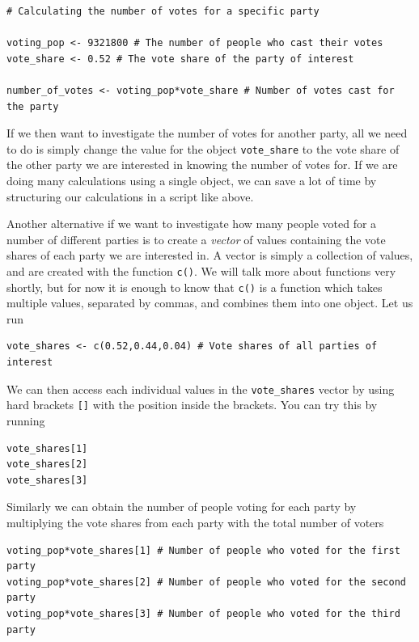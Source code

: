 \documentclass[
]{book}
\begin{document}
\begin{verbatim}
# Calculating the number of votes for a specific party

voting_pop <- 9321800 # The number of people who cast their votes
vote_share <- 0.52 # The vote share of the party of interest

number_of_votes <- voting_pop*vote_share # Number of votes cast for the party
\end{verbatim}

If we then want to investigate the number of votes for another party, all we need to do is simply change the value for the object \texttt{vote\_share} to the vote share of the other party we are interested in knowing the number of votes for. If we are doing many calculations using a single object, we can save a lot of time by structuring our calculations in a script like above.

Another alternative if we want to investigate how many people voted for a number of different parties is to create a \emph{vector} of values containing the vote shares of each party we are interested in. A vector is simply a collection of values, and are created with the function \texttt{c()}. We will talk more about functions very shortly, but for now it is enough to know that \texttt{c()} is a function which takes multiple values, separated by commas, and combines them into one object. Let us run

\begin{verbatim}
vote_shares <- c(0.52,0.44,0.04) # Vote shares of all parties of interest
\end{verbatim}

We can then access each individual values in the \texttt{vote\_shares} vector by using hard brackets \texttt{{[}{]}} with the position inside the brackets. You can try this by running

\begin{verbatim}
vote_shares[1]
vote_shares[2]
vote_shares[3]
\end{verbatim}

Similarly we can obtain the number of people voting for each party by multiplying the vote shares from each party with the total number of voters

\begin{verbatim}
voting_pop*vote_shares[1] # Number of people who voted for the first party
voting_pop*vote_shares[2] # Number of people who voted for the second party
voting_pop*vote_shares[3] # Number of people who voted for the third party
\end{verbatim}
\end{document}
